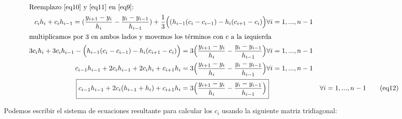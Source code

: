 \begin{align*}
\intertext{Reemplazo \eqref{eq10} y \eqref{eq11} en \eqref{eq9}:}
c_{i}h_{i} +  c_ih_{i-1} = (\frac{y_{i+1}-y_{i}}{h_{i}}  -\frac{y_i-y_{i-1}}{h_{i-1}}) + \frac{1}{3}\Big((h_{i-1}(c_i-c_{i-1})  - h_{i}(c_{i+1}-c_{i})\Big) & \forall i= 1, ..., n-1 \\
\intertext{multiplicamos por 3 en ambos lados y movemos los términos con c a la izquierda}
3c_{i}h_{i} +  3c_ih_{i-1} - \Big(h_{i-1}(c_i-c_{i-1})  - h_{i}(c_{i+1}-c_{i})\Big) =  3\Big(\frac{y_{i+1}-y_{i}}{h_{i}}  -\frac{y_i-y_{i-1}}{h_{i-1}}\Big) & \forall i= 1, ..., n-1 \\
c_{i-1}h_{i-1} + 2c_ih_{i-1} + 2c_ih_i + c_{i+1}h_i =  3\Big(\frac{y_{i+1}-y_{i}}{h_{i}} - \frac{y_i-y_{i-1}}{h_{i-1}}\Big)  & \forall i= 1, ..., n-1 \\
\Aboxed{c_{i-1}h_{i-1} + 2c_i(h_{i-1} + h_i) + c_{i+1}h_i =  3\Big(\frac{y_{i+1}-y_{i}}{h_{i}}  -\frac{y_i-y_{i-1}}{h_{i-1}}\Big)} & \forall i= 1, ..., n-1 \tag{eq12} \label{eq12}
\end{align*}

\par Podemos escribir el sistema de ecuaciones resultante para calcular los $c_i$ usando la siguiente matriz tridiagonal: 


